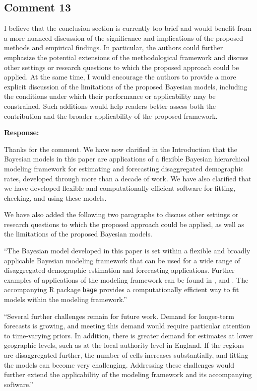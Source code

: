 \documentclass[11pt,a4paper]{article}
\newlength{\replyspace}
\newenvironment{response}{\par\addvspace{\replyspace}\nopagebreak\textbf{\textcolor{replyblue}{Response:}}\par\begingroup\color{replyblue}}{\par\endgroup\vspace{\replyspace}}
\newcommand{\refcomment}[2]{\par\Needspace{5\baselineskip}\subsection*{#1}#2\par}
\begin{document}
\refcomment{Comment 13}{
I believe that the conclusion section is currently too brief and would benefit from a more nuanced discussion of the significance and implications of the proposed methods and empirical findings. In particular, the authors could further emphasize the potential extensions of the methodological framework and discuss other settings or research questions to which the proposed approach could be applied. At the same time, I would encourage the authors to provide a more explicit discussion of the limitations of the proposed Bayesian models, including the conditions under which their performance or applicability may be constrained. Such additions would help readers better assess both the contribution and the broader applicability of the proposed framework.
}
\begin{response}
Thanks for the comment. We have now clarified in the Introduction that the Bayesian models in
this paper are applications of a flexible Bayesian hierarchical modeling framework for estimating
and forecasting disaggregated demographic rates, developed through more than a decade of work.
We have also clarified that we have developed flexible and computationally efficient software for fitting, checking, and using these models.

We have also added the following two paragraphs to discuss other settings or research questions to which the proposed approach could be applied, as well as the limitations of the proposed Bayesian models.

``The Bayesian model developed in this paper is set within a flexible and broadly applicable Bayesian modeling framework that can be used for a wide range of disaggregated demographic estimation and forecasting applications.  Further examples of applications of the modeling framework can be found in \cite{bryant2018bayesian}, \cite{zhang2019bayesian} and \cite{bryant2026estimating}. The accompanying R package \texttt{bage} provides a computationally efficient way to fit models within the modeling framework.''

``Several further challenges remain for future work. Demand for longer-term forecasts is growing, and meeting this demand would require particular attention to time-varying priors. In addition, there is greater demand for estimates at lower geographic levels, such as at the local authority level in England. If the regions are disaggregated further, the number of cells increases substantially, and fitting the models can become very challenging. Addressing these challenges would further extend the applicability of the modeling framework and its accompanying software.''
\end{response}
\end{document}
